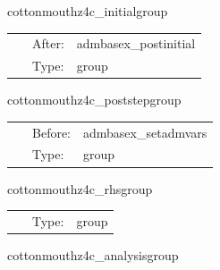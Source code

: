 \documentclass{article}
\begin{document}
\vspace{5mm}


\hspace{5mm} cottonmouthz4c\_initialgroup 

\hspace{5mm}{\it z4 initialization routines } 


\hspace{5mm}

 \begin{tabular*}{160mm}{cll} 
~ & After:  & admbasex\_postinitial \\ 
~ & Type:  & group \\ 
\end{tabular*} 


\vspace{5mm}


\hspace{5mm} cottonmouthz4c\_poststepgroup 

\hspace{5mm}{\it z4 post-step routines } 


\hspace{5mm}

 \begin{tabular*}{160mm}{cll} 
~ & Before:  & admbasex\_setadmvars \\ 
~ & Type:  & group \\ 
\end{tabular*} 


\vspace{5mm}


\hspace{5mm} cottonmouthz4c\_rhsgroup 

\hspace{5mm}{\it z4 equations rhs computation } 


\hspace{5mm}

 \begin{tabular*}{160mm}{cll} 
~ & Type:  & group \\ 
\end{tabular*} 


\vspace{5mm}


\hspace{5mm} cottonmouthz4c\_analysisgroup 
\end{document}
